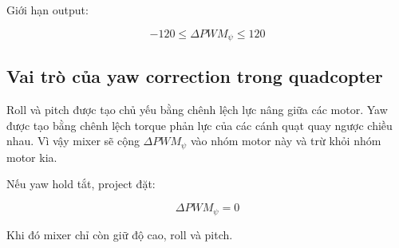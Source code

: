 Giới hạn output:

\begin{equation}
    -120
    \leq
    \Delta PWM_\psi
    \leq
    120
\end{equation}

\subsection{Vai trò của yaw correction trong quadcopter}

Roll và pitch được tạo chủ yếu bằng chênh lệch lực nâng giữa các motor. Yaw
được tạo bằng chênh lệch torque phản lực của các cánh quạt quay ngược chiều
nhau. Vì vậy mixer sẽ cộng $\Delta PWM_\psi$ vào nhóm motor này và trừ khỏi
nhóm motor kia.

Nếu yaw hold tắt, project đặt:

\begin{equation}
    \Delta PWM_\psi = 0
\end{equation}

Khi đó mixer chỉ còn giữ độ cao, roll và pitch.
